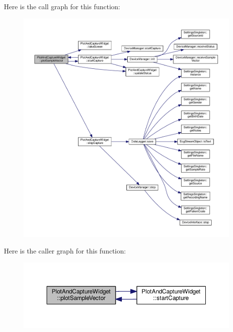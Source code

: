 Here is the call graph for this function\+:\nopagebreak
\begin{figure}[H]
\begin{center}
\leavevmode
\includegraphics[width=350pt]{classPlotAndCaptureWidget_a7dca31208a65906f0a96bf4143e0da4f_cgraph}
\end{center}
\end{figure}




Here is the caller graph for this function\+:\nopagebreak
\begin{figure}[H]
\begin{center}
\leavevmode
\includegraphics[width=348pt]{classPlotAndCaptureWidget_a7dca31208a65906f0a96bf4143e0da4f_icgraph}
\end{center}
\end{figure}


